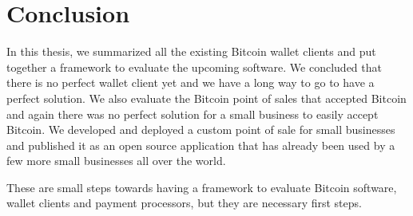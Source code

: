 
\chapter{Conclusion}

In this thesis, we summarized all the existing Bitcoin wallet clients and put together a framework to evaluate the upcoming software. We concluded that there is no perfect wallet client yet and we have a long way to go to have a perfect solution. We also evaluate the Bitcoin point of sales that accepted Bitcoin and again there was no perfect solution for a small business to easily accept Bitcoin. We developed and deployed a custom point of sale for small businesses and published it as an open source application that has already been used by a few more small businesses all over the world.

These are small steps towards having a framework to evaluate Bitcoin software, wallet clients and payment processors, but they are necessary first steps.

 